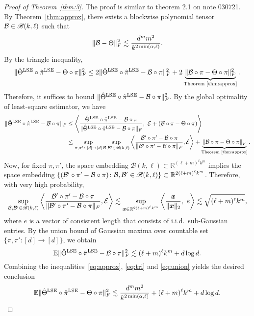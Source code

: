\documentclass[11pt]{article}
\theoremstyle{definition}
\newcommand*{\KeepStyleUnderBrace}[1]{%
  \mathop{%
    \mathchoice
    {\underbrace{\displaystyle#1}}%
    {\underbrace{\textstyle#1}}%
    {\underbrace{\scriptstyle#1}}%
    {\underbrace{\scriptscriptstyle#1}}%
  }\limits
}
\def\caliB{\mathscr{B}}
\begin{document}
\begin{proof}[Proof of Theorem~\ref{thm:3}] The proof is similar to theorem 2.1 on note 030721. By Theorem~\ref{thm:approx}, there exists a blockwise polynomial tensor $\tB\in\caliB(k,\ell)$ such that
\begin{equation}\label{eq:approx}
\lVert\mathcal{B}-\Theta\rVert_F^2\lesssim {d^mm^2\over k^{2\min(\alpha,\ell)}}.
\end{equation}
By the triangle inequality,
\begin{equation}\label{eq:tri}
\FnormSize{}{\hat\Theta^\textup{LSE}\circ\hat\pi^\textup{LSE} -\Theta\circ \pi}^2\leq 2\FnormSize{}{\hat\Theta^\textup{LSE}\circ\hat\pi^\textup{LSE} -\tB\circ \pi}^2+2\KeepStyleUnderBrace{\FnormSize{}{\tB\circ \pi-\Theta\circ \pi}^2}_{\textup{Theorem~\ref{thm:approx}}}.
\end{equation}
Therefore, it suffices to bound $\lVert\hat\Theta^\textup{LSE}\circ\hat\pi^\textup{LSE} -\mathcal{B}\circ \pi\rVert_F^2$. By the global optimality of least-square estimator, we have
\begin{align}
\FnormSize{}{\hat\Theta^\textup{LSE}\circ\hat\pi^\textup{LSE} -\tB\circ \pi}&\leq \left\langle {\hat \Theta^\textup{LSE}\circ \hat \pi^\textup{LSE}-\tB\circ \pi \over \FnormSize{}{ \hat \Theta^\textup{LSE}\circ \hat \pi^\textup{LSE}-\tB\circ \pi}},\ \tE+(\tB\circ \pi-\Theta\circ \pi) \right \rangle \\
&\leq \sup_{\pi, \pi'\colon[d]\to[d]}\sup_{\tB, \tB'\in \caliB(k,\ell)} \left\langle {\tB'\circ \pi'-\tB\circ \pi \over \FnormSize{}{\tB'\circ \pi'-\tB\circ \pi}}, \tE \right \rangle+\KeepStyleUnderBrace{\FnormSize{}{\tB\circ \pi-\Theta\circ \pi}}_{\textup{Theorem~\ref{thm:approx}}}.
\end{align}
Now, for fixed $\pi,\pi'$, the space embedding $\caliB(k,\ell)\subset \mathbb{R}^{(\ell+m)^\ell k^m}$ implies the space embedding $\{(\tB'\circ \pi'-\tB\circ \pi)\colon \tB, \tB'\in\caliB(k,\ell)\} \subset\mathbb{R}^{2(\ell+m)^\ell k^m}$. Therefore, with very high probability, 
\[
\sup_{\tB, \tB'\in \caliB(k,\ell)} \left\langle {\tB'\circ \pi'-\tB\circ \pi \over \FnormSize{}{\tB'\circ \pi'-\tB\circ \pi}}, \tE \right \rangle \lesssim \sup_{\mx\in \mathbb{R}^{2(\ell+m)^\ell k^m} }\left\langle {\mx\over \vnormSize{}{\mx}},\ e \right\rangle \lesssim \sqrt{(\ell+m)^\ell k^m},
\]
where $e$ is a vector of consistent length that consists of i.i.d.\ sub-Gaussian entries. By the union bound of Gaussian maxima over countable set $\{\pi,\pi'\colon [d]\to[d]\}$, we obtain
\begin{equation}\label{eq:union}
\mathbb{E}\lVert\hat\Theta^\textup{LSE}\circ\hat\pi^\textup{LSE} -\mathcal{B}\circ \pi\rVert_F^2\lesssim (\ell+m)^\ell k^m+d\log d.
\end{equation}
Combining the inequalities~\eqref{eq:approx}, \eqref{eq:tri} and \eqref{eq:union} yields the desired conclusion
\[
\mathbb{E}\lVert\hat\Theta^\textup{LSE}\circ\hat\pi^\textup{LSE} -\Theta\circ \pi\rVert_F^2\lesssim  {d^m m^2\over k^{2\min(\alpha, \ell)}}+(\ell+m)^\ell k^m+d\log d.
\]
\end{proof}
\end{document}
